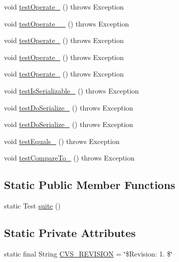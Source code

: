 \begin{DoxyCompactItemize}
\item 
void \hyperlink{classorg_1_1jgap_1_1impl_1_1_crossover_operator_test_a37f0eff1c6dd05e110b11949b38fc77a}{test\-Operate\-\_} ()  throws Exception 
\item 
void \hyperlink{classorg_1_1jgap_1_1impl_1_1_crossover_operator_test_a071dfc861b18f3b974fcc29344965f3c}{test\-Operate\-\_\-\_} ()  throws Exception 
\item 
void \hyperlink{classorg_1_1jgap_1_1impl_1_1_crossover_operator_test_a568a7b05bdcaee46722fa2d2caab2ba0}{test\-Operate\-\_} ()  throws Exception 
\item 
void \hyperlink{classorg_1_1jgap_1_1impl_1_1_crossover_operator_test_a04597a3c0b3976e1f9e723e74072ed76}{test\-Operate\-\_} ()  throws Exception 
\item 
void \hyperlink{classorg_1_1jgap_1_1impl_1_1_crossover_operator_test_a6a9c8507f438a534c8a44f3b662cc9d1}{test\-Operate\-\_} ()  throws Exception 
\item 
void \hyperlink{classorg_1_1jgap_1_1impl_1_1_crossover_operator_test_a732469b287c30040bf26e7f6751c119b}{test\-Is\-Serializable\-\_} ()  throws Exception 
\item 
void \hyperlink{classorg_1_1jgap_1_1impl_1_1_crossover_operator_test_a190fff4ebb6548e7b1d218f48f51a017}{test\-Do\-Serialize\-\_} ()  throws Exception 
\item 
void \hyperlink{classorg_1_1jgap_1_1impl_1_1_crossover_operator_test_a9b0421cd898462856e66131b7590141a}{test\-Do\-Serialize\-\_} ()  throws Exception 
\item 
void \hyperlink{classorg_1_1jgap_1_1impl_1_1_crossover_operator_test_abdcf80d860e979d58f927d43bc84a101}{test\-Equals\-\_} ()  throws Exception 
\item 
void \hyperlink{classorg_1_1jgap_1_1impl_1_1_crossover_operator_test_ae6d7cab1227e4a66387f65012a16850b}{test\-Compare\-To\-\_} ()  throws Exception 
\end{DoxyCompactItemize}
\subsection*{Static Public Member Functions}
\begin{DoxyCompactItemize}
\item 
static Test \hyperlink{classorg_1_1jgap_1_1impl_1_1_crossover_operator_test_a588500ff8b6226360226992109bd2a60}{suite} ()
\end{DoxyCompactItemize}
\subsection*{Static Private Attributes}
\begin{DoxyCompactItemize}
\item 
static final String \hyperlink{classorg_1_1jgap_1_1impl_1_1_crossover_operator_test_a1180c6a35312f0980ba5da290657cd15}{C\-V\-S\-\_\-\-R\-E\-V\-I\-S\-I\-O\-N} = \char`\"{}\$Revision\-: 1. \$\char`\"{}
\end{DoxyCompactItemize}

